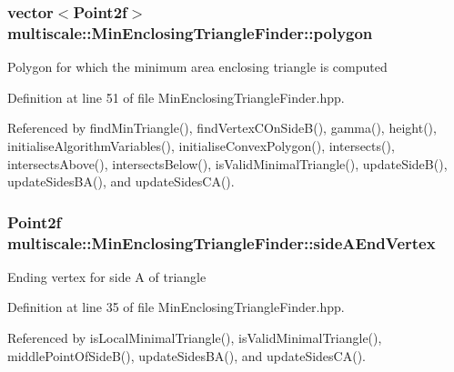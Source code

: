 \hypertarget{classmultiscale_1_1MinEnclosingTriangleFinder_add5aecf2c138345091d55076bdc253a4}{
\subsubsection[{polygon}]{\setlength{\rightskip}{0pt plus 5cm}vector$<$\-Point2f$>$ {\bf multiscale\-::\-Min\-Enclosing\-Triangle\-Finder\-::polygon}}}\label{classmultiscale_1_1MinEnclosingTriangleFinder_add5aecf2c138345091d55076bdc253a4}
\-Polygon for which the minimum area enclosing triangle is computed 

\-Definition at line 51 of file \-Min\-Enclosing\-Triangle\-Finder.\-hpp.



\-Referenced by find\-Min\-Triangle(), find\-Vertex\-C\-On\-Side\-B(), gamma(), height(), initialise\-Algorithm\-Variables(), initialise\-Convex\-Polygon(), intersects(), intersects\-Above(), intersects\-Below(), is\-Valid\-Minimal\-Triangle(), update\-Side\-B(), update\-Sides\-B\-A(), and update\-Sides\-C\-A().

\hypertarget{classmultiscale_1_1MinEnclosingTriangleFinder_a132a1e2eed61d579e6038089fe08d150}{
\subsubsection[{side\-A\-End\-Vertex}]{\setlength{\rightskip}{0pt plus 5cm}\-Point2f {\bf multiscale\-::\-Min\-Enclosing\-Triangle\-Finder\-::side\-A\-End\-Vertex}}}\label{classmultiscale_1_1MinEnclosingTriangleFinder_a132a1e2eed61d579e6038089fe08d150}
\-Ending vertex for side \-A of triangle 

\-Definition at line 35 of file \-Min\-Enclosing\-Triangle\-Finder.\-hpp.



\-Referenced by is\-Local\-Minimal\-Triangle(), is\-Valid\-Minimal\-Triangle(), middle\-Point\-Of\-Side\-B(), update\-Sides\-B\-A(), and update\-Sides\-C\-A().

